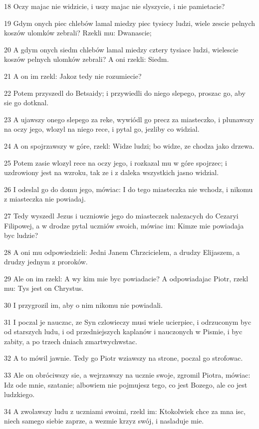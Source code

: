 \par 18 Oczy majac nie widzicie, i uszy majac nie slyszycie, i nie pamietacie?
\par 19 Gdym onych piec chlebów lamal miedzy piec tysiecy ludzi, wiele zescie pelnych koszów ulomków zebrali? Rzekli mu: Dwanascie;
\par 20 A gdym onych siedm chlebów lamal miedzy cztery tysiace ludzi, wielescie koszów pelnych ulomków zebrali? A oni rzekli: Siedm.
\par 21 A on im rzekl: Jakoz tedy nie rozumiecie?
\par 22 Potem przyszedl do Betsaidy; i przywiedli do niego slepego, proszac go, aby sie go dotknal.
\par 23 A ujawszy onego slepego za reke, wywiódl go precz za miasteczko, i plunawszy na oczy jego, wlozyl na niego rece, i pytal go, jezliby co widzial.
\par 24 A on spojrzawszy w góre, rzekl: Widze ludzi; bo widze, ze chodza jako drzewa.
\par 25 Potem zasie wlozyl rece na oczy jego, i rozkazal mu w góre spojrzec; i uzdrowiony jest na wzroku, tak ze i z daleka wszystkich jasno widzial.
\par 26 I odeslal go do domu jego, mówiac: I do tego miasteczka nie wchodz, i nikomu z miasteczka nie powiadaj.
\par 27 Tedy wyszedl Jezus i uczniowie jego do miasteczek nalezacych do Cezaryi Filipowej, a w drodze pytal uczniów swoich, mówiac im: Kimze mie powiadaja byc ludzie?
\par 28 A oni mu odpowiedzieli: Jedni Janem Chrzcicielem, a drudzy Elijaszem, a drudzy jednym z proroków.
\par 29 Ale on im rzekl: A wy kim mie byc powiadacie? A odpowiadajac Piotr, rzekl mu: Tys jest on Chrystus.
\par 30 I przygrozil im, aby o nim nikomu nie powiadali.
\par 31 I poczal je nauczac, ze Syn czlowieczy musi wiele ucierpiec, i odrzuconym byc od starszych ludu, i od przedniejszych kaplanów i nauczonych w Pismie, i byc zabity, a po trzech dniach zmartwychwstac.
\par 32 A to mówil jawnie. Tedy go Piotr wziawszy na strone, poczal go strofowac.
\par 33 Ale on obróciwszy sie, a wejrzawszy na ucznie swoje, zgromil Piotra, mówiac: Idz ode mnie, szatanie; albowiem nie pojmujesz tego, co jest Bozego, ale co jest ludzkiego.
\par 34 A zwolawszy ludu z uczniami swoimi, rzekl im: Ktokolwiek chce za mna isc, niech samego siebie zaprze, a wezmie krzyz swój, i nasladuje mie.
